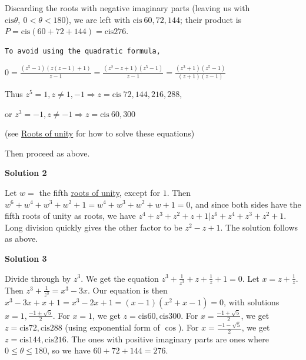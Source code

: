 \begin{enumerate}
 Discarding the roots with negative imaginary parts (leaving us with $\mathrm{cis} \theta,\ 0 < \theta < 180$), we are left with $\mathrm{cis}\ 60, 72, 144$; their product is $P = \mathrm{cis} (60 + 72 + 144) = \mathrm{cis} \boxed{276}$.

 \begin{verbatim}
To avoid using the quadratic formula,
\end{verbatim}

$0 = \frac{(z^5 - 1)(z(z-1)+1)}{z-1} = \frac{(z^2-z+1)(z^5-1)}{z-1} = \frac{(z^3+1)(z^5-1)}{(z+1)(z-1)}$

 Thus $z^5 = 1, z \neq 1, -1 \Longrightarrow z = \mathrm{cis}\ 72, 144, 216, 288$,

 or $z^3 = -1, z \neq -1 \Longrightarrow z = \mathrm{cis}\ 60, 300$ 

 (see \href{https://artofproblemsolving.com/wiki/index.php?title=Roots\_of\_unity}{Roots of unity} for how to solve these equations)

 Then proceed as above.

 



\textbf{Solution 2}

Let $w =$ the fifth \href{https://artofproblemsolving.com/wiki/index.php?title=Roots\_of\_unity}{roots of unity}, except for $1$. Then $w^6 + w^4 + w^3 + w^2 + 1 = w^4 + w^3 + w^2 + w + 1 = 0$, and since both sides have the fifth roots of unity as roots, we have $z^4 + z^3 + z^2 + z + 1  | z^6 + z^4 + z^3 + z^2 + 1$. Long division quickly gives the other factor to be $z^2 - z + 1$. The solution follows as above.

 



\textbf{Solution 3}

Divide through by $z^3$. We get the equation $z^3 + \frac {1}{z^3} + z + \frac {1}{z} + 1 = 0$. Let $x = z + \frac {1}{z}$. Then $z^3 + \frac {1}{z^3} = x^3 - 3x$. Our equation is then $x^3 - 3x + x + 1 = x^3 - 2x + 1 = (x - 1)(x^2 + x - 1) = 0$, with solutions $x = 1, \frac { - 1\pm\sqrt {5}}{2}$. For $x = 1$, we get $z = \text{cis}60,\text{cis}300$. For $x = \frac { - 1 + \sqrt {5}}{2}$, we get $z = \text{cis}{72},\text{cis}{288}$ (using exponential form of $\cos$). For $x = \frac { - 1 - \sqrt {5}}{2}$, we get $z = \text{cis}144,\text{cis}216$. The ones with positive imaginary parts are ones where $0\le\theta\le180$, so we have $60 + 72 + 144 = \boxed{276}$.

 




\end{enumerate}
